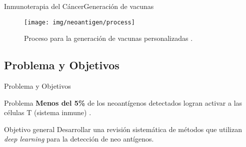 \documentclass[10pt]{beamer}
\newcommand{\1}{
	\setbeamertemplate{background}{
		\texttt{[image: img/1]}
		\tikz[overlay] \fill[fill opacity=0.75,fill=white] (0,0) rectangle (-\paperwidth,\paperheight);
	}
}
\begin{document}
\begin{frame}{Inmunoterapia del Cáncer}{Generación de vacunas}	
	\begin{figure}
		\texttt{[image: img/neoantigen/process]}
		\caption{Proceso para la generación de vacunas personalizadas \cite{peng2019neoantigen}.}
	\end{figure}		
\end{frame}





\subsection{Problema y Objetivos}


\begin{frame}{Problema y Objetivos}{}
	
	\begin{block}{Problema}
		\textbf{Menos del 5\%} de los neoantígenos detectados logran activar a las células T (sistema inmune) \cite{de2020neoantigen}. 
	\end{block}
		

	\begin{block}{Objetivo general}
		Desarrollar una revisión sistemática de métodos que utilizan \textit{deep learning} para la detección de neo antígenos.
	\end{block}	

\end{frame}
\end{document}

